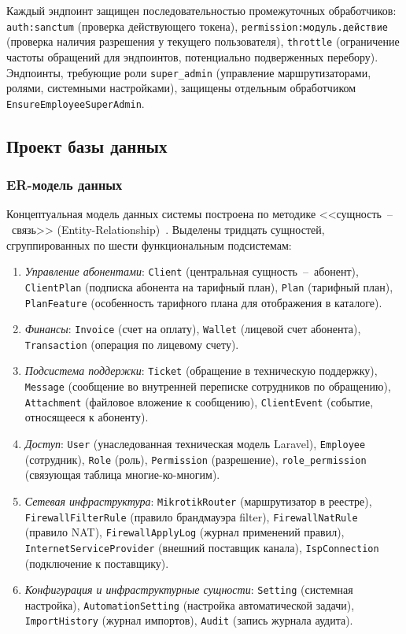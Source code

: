 Каждый эндпоинт защищен последовательностью промежуточных обработчиков: \texttt{auth:sanctum} (проверка действующего токена), \texttt{permission:модуль.действие} (проверка наличия разрешения у текущего пользователя), \texttt{throttle} (ограничение частоты обращений для эндпоинтов, потенциально подверженных перебору). Эндпоинты, требующие роли \texttt{super\_admin} (управление маршрутизаторами, ролями, системными настройками), защищены отдельным обработчиком \texttt{EnsureEmployeeSuperAdmin}.

\subsection{Проект базы данных}

\subsubsection{ER-модель данных}

Концептуальная модель данных системы построена по методике <<сущность~--~связь>> (Entity-Relationship)~\cite{date,connolly}. Выделены тридцать сущностей, сгруппированных по шести функциональным подсистемам:
\begin{enumerate}
\item \emph{Управление абонентами}: \texttt{Client} (центральная сущность~--~абонент), \texttt{ClientPlan} (подписка абонента на тарифный план), \texttt{Plan} (тарифный план), \texttt{PlanFeature} (особенность тарифного плана для отображения в каталоге).
\item \emph{Финансы}: \texttt{Invoice} (счет на оплату), \texttt{Wallet} (лицевой счет абонента), \texttt{Transaction} (операция по лицевому счету).
\item \emph{Подсистема поддержки}: \texttt{Ticket} (обращение в техническую поддержку), \texttt{Message} (сообщение во внутренней переписке сотрудников по обращению), \texttt{Attachment} (файловое вложение к сообщению), \texttt{ClientEvent} (событие, относящееся к абоненту).
\item \emph{Доступ}: \texttt{User} (унаследованная техническая модель Laravel), \texttt{Employee} (сотрудник), \texttt{Role} (роль), \texttt{Permission} (разрешение), \texttt{role\_permission} (связующая таблица многие-ко-многим).
\item \emph{Сетевая инфраструктура}: \texttt{MikrotikRouter} (маршрутизатор в реестре), \texttt{FirewallFilterRule} (правило брандмауэра filter), \texttt{FirewallNatRule} (правило NAT), \texttt{FirewallApplyLog} (журнал применений правил), \texttt{InternetServiceProvider} (внешний поставщик канала), \texttt{IspConnection} (подключение к поставщику).
\item \emph{Конфигурация и инфраструктурные сущности}: \texttt{Setting} (системная настройка), \texttt{AutomationSetting} (настройка автоматической задачи), \texttt{ImportHistory} (журнал импортов), \texttt{Audit} (запись журнала аудита).
\end{enumerate}

